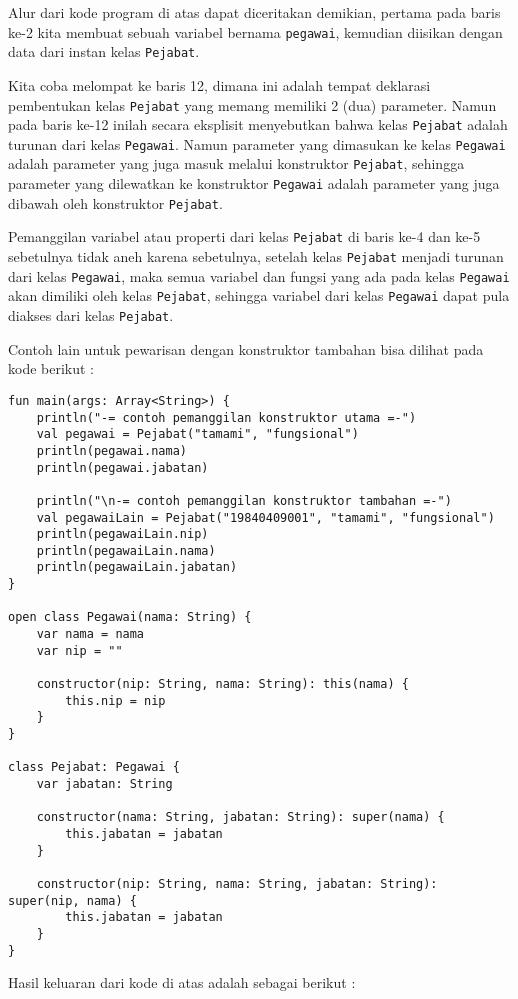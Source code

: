Alur dari kode program di atas dapat diceritakan demikian, pertama pada baris ke-2 kita membuat sebuah variabel bernama \texttt{pegawai}, kemudian diisikan dengan data dari instan kelas \texttt{Pejabat}.

Kita coba melompat ke baris 12, dimana ini adalah tempat deklarasi pembentukan kelas \texttt{Pejabat} yang memang memiliki 2 (dua) parameter. Namun pada baris ke-12 inilah secara eksplisit menyebutkan bahwa kelas \texttt{Pejabat} adalah turunan dari kelas \texttt{Pegawai}. Namun parameter yang dimasukan ke kelas \texttt{Pegawai} adalah parameter yang juga masuk melalui konstruktor \texttt{Pejabat}, sehingga parameter yang dilewatkan ke konstruktor \texttt{Pegawai} adalah parameter yang juga dibawah oleh konstruktor \texttt{Pejabat}.

Pemanggilan variabel atau properti dari kelas \texttt{Pejabat} di baris ke-4 dan ke-5 sebetulnya tidak aneh karena sebetulnya, setelah kelas \texttt{Pejabat} menjadi turunan dari kelas \texttt{Pegawai}, maka semua variabel dan fungsi yang ada pada kelas \texttt{Pegawai} akan dimiliki oleh kelas \texttt{Pejabat}, sehingga variabel dari kelas \texttt{Pegawai} dapat pula diakses dari kelas \texttt{Pejabat}.

Contoh lain untuk pewarisan dengan konstruktor tambahan bisa dilihat pada kode berikut :

\begin{lstlisting}
fun main(args: Array<String>) {
	println("-= contoh pemanggilan konstruktor utama =-")
	val pegawai = Pejabat("tamami", "fungsional")
	println(pegawai.nama)
	println(pegawai.jabatan)
	
	println("\n-= contoh pemanggilan konstruktor tambahan =-")
	val pegawaiLain = Pejabat("19840409001", "tamami", "fungsional")
	println(pegawaiLain.nip)
	println(pegawaiLain.nama)
	println(pegawaiLain.jabatan)
}

open class Pegawai(nama: String) {
	var nama = nama
	var nip = ""
	
	constructor(nip: String, nama: String): this(nama) {
		this.nip = nip
	}
}

class Pejabat: Pegawai {
	var jabatan: String
	
	constructor(nama: String, jabatan: String): super(nama) {
		this.jabatan = jabatan
	}
	
	constructor(nip: String, nama: String, jabatan: String): super(nip, nama) {
		this.jabatan = jabatan
	}
}
\end{lstlisting}

Hasil keluaran dari kode di atas adalah sebagai berikut :

